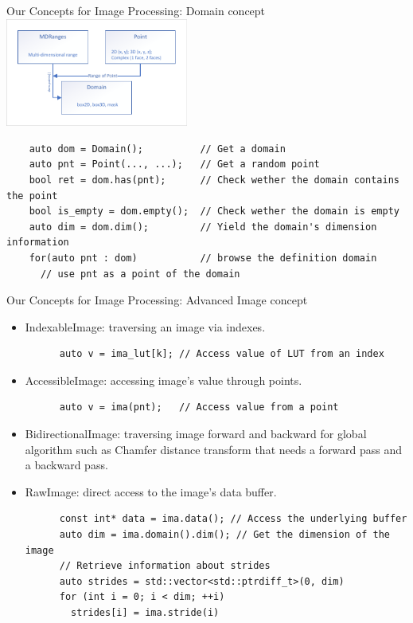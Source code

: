 \documentclass[12pt,aspectratio=169]{beamer}
\begin{document}
\begin{frame}[fragile]{Our Concepts for Image Processing: Domain concept}
  \centering
  \includegraphics[width=0.45\textwidth]{../figures/concepts/domain}
  \begin{verbatim}
    auto dom = Domain();          // Get a domain
    auto pnt = Point(..., ...);   // Get a random point
    bool ret = dom.has(pnt);      // Check wether the domain contains the point
    bool is_empty = dom.empty();  // Check wether the domain is empty
    auto dim = dom.dim();         // Yield the domain's dimension information
    for(auto pnt : dom)           // browse the definition domain
      // use pnt as a point of the domain
  \end{verbatim}
\end{frame}

\begin{frame}[fragile]{Our Concepts for Image Processing: Advanced Image concept}
  \begin{itemize}
    \item IndexableImage: traversing an image via indexes.
          \begin{verbatim}
      auto v = ima_lut[k]; // Access value of LUT from an index
    \end{verbatim}
    \item AccessibleImage: accessing image's value through points.
          \begin{verbatim}
      auto v = ima(pnt);   // Access value from a point
    \end{verbatim}
    \item BidirectionalImage: traversing image forward and backward for global algorithm such as Chamfer distance
          transform that needs a forward pass and a backward pass.
    \item RawImage: direct access to the image's data buffer.
          \begin{verbatim}
      const int* data = ima.data(); // Access the underlying buffer
      auto dim = ima.domain().dim(); // Get the dimension of the image
      // Retrieve information about strides
      auto strides = std::vector<std::ptrdiff_t>(0, dim)
      for (int i = 0; i < dim; ++i)
        strides[i] = ima.stride(i)
      \end{verbatim}
  \end{itemize}
\end{frame}
\end{document}
